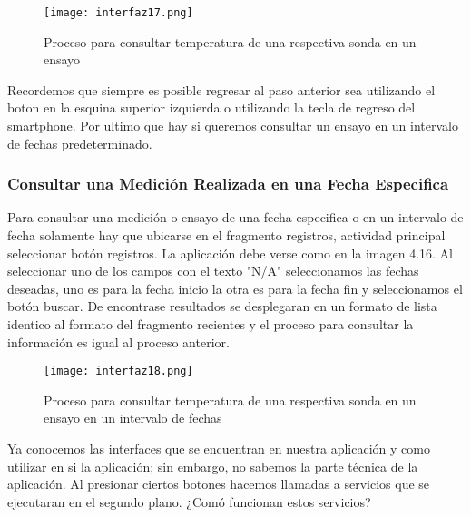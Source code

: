 \begin{figure}[H]
	\centering
	\texttt{[image: interfaz17.png]}
	\caption{Proceso para consultar temperatura de una respectiva sonda en un ensayo}
\end{figure}

\par \noindent
Recordemos que siempre es posible regresar al paso anterior sea utilizando el boton en la esquina superior izquierda o utilizando la tecla de regreso del smartphone. Por ultimo que hay si queremos consultar un ensayo en un intervalo de fechas predeterminado. 

\clearpage

\subsubsection{Consultar una Medición Realizada en una Fecha Especifica}

\par 
Para consultar una medición o ensayo de una fecha especifica o en un intervalo de fecha solamente hay que ubicarse en el fragmento registros, actividad principal seleccionar botón registros. La aplicación debe verse como en la imagen 4.16. Al seleccionar uno de los campos con el texto "N/A" seleccionamos las fechas deseadas, uno es para la fecha inicio la otra es para la fecha fin y seleccionamos el botón buscar. De encontrase resultados se desplegaran en un formato de lista identico al formato del fragmento recientes y el proceso para consultar la información es igual al proceso anterior.

\begin{figure}[H]
	\centering
	\texttt{[image: interfaz18.png]}
	\caption{Proceso para consultar temperatura de una respectiva sonda en un ensayo en un intervalo de fechas}
\end{figure}

\par \noindent
Ya conocemos las interfaces que se encuentran en nuestra aplicación y como utilizar en si la aplicación; sin embargo, no sabemos la parte técnica de la aplicación. Al presionar ciertos botones hacemos llamadas a servicios que se ejecutaran en el segundo plano. ¿Comó funcionan estos servicios?
